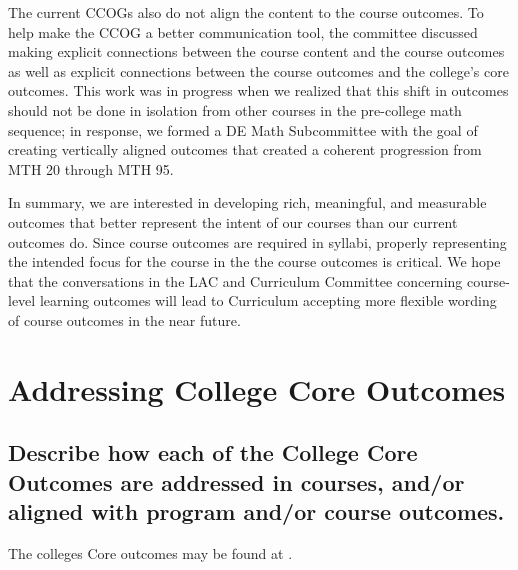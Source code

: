 The current CCOGs also do not align the content to the course outcomes. To help make the CCOG a better communication tool, the committee discussed making explicit connections between the course content and the course outcomes as well as explicit connections between the course outcomes and the college's core outcomes.  This work was in progress when we realized that this shift in outcomes should not be done in isolation from other courses in the pre-college math sequence; in response, we formed a DE Math Subcommittee with the goal of creating vertically aligned outcomes that created a coherent progression from MTH 20 through MTH 95.

In summary, we are interested in developing rich, meaningful, and measurable outcomes that better represent the intent of our courses than our current outcomes do. Since course outcomes are required in syllabi, properly representing the intended focus for the course in the the course outcomes is critical. We hope that the conversations in the LAC and Curriculum Committee concerning course-level learning outcomes will lead to Curriculum accepting more flexible wording of course outcomes in the near future.

\section{Addressing College Core Outcomes}

\subsection{Describe how each of the College Core Outcomes are addressed in courses, and/or aligned with program and/or course outcomes.}

The colleges Core outcomes may be found at \cite{coreoutcomes}.

